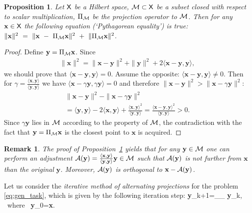 \documentclass[sii]{ipart}
\newtheorem{proposition}{Proposition}
\newtheorem{remark}{Remark}
\newcommand{\bfx}{\textbf{x}}
\newcommand{\bfy}{\textbf{y}}
\begin{document}
\begin{proposition} \label{prop:pythaprop}
	Let $\mathsf{X}$ be a Hilbert space, $\mathcal{M} \subset \mathsf{X}$ be a subset closed with respect to scalar multiplication, $\Pi_{\mathcal{M}}$ be the projection operator to $\mathcal{M}$. Then for any $\bfx \in \sfX$ the following equation (`Pythagorean equality') is true: $\|\bfx\|^2~=~\|\bfx~-~\Pi_\calM \bfx\|^2~+~\|\Pi_\calM \bfx\|^2$.
\end{proposition}

\begin{proof}
	Define $\bfy = \Pi_\calM \bfx$. Since
	\begin{gather*}
	\|\bfx\|^2 = \|\bfx - \bfy \|^2 + \|\bfy \|^2 + 2 \langle \bfx - \bfy, \bfy \rangle,
	\end{gather*}
    we should prove that $\langle \bfx - \bfy, \bfy \rangle = 0$.
	Assume the opposite: $\langle \bfx - \bfy, \bfy \rangle \ne 0$. Then for
    $\gamma = \frac{\langle \bfx, \bfy \rangle}{\langle \bfy, \bfy \rangle}$ we have
    $\langle \bfx - \gamma \bfy, \gamma \bfy \rangle = 0$
    and  therefore $\|\bfx - \bfy\|^2 > \|\bfx - \gamma \bfy\|^2$:
	\begin{gather*}
	\|\bfx - \bfy\|^2 - \|\bfx - \gamma \bfy\|^2 \\ =\langle \bfy, \bfy \rangle - 2 \langle \bfx, \bfy \rangle + \frac{\langle \bfx, \bfy \rangle ^ 2}{\langle \bfy, \bfy \rangle} =
    \frac{\langle \bfx - \bfy, \bfy \rangle^2}{\langle \bfy, \bfy \rangle} > 0.
	\end{gather*}
	Since 	$\gamma \bfy$ lies in $\mathcal{M}$ according to the property of $\mathcal{M}$,
    the contradiction with the fact that $\bfy = \Pi_\calM \bfx$ is the closest point to $\bfx$ is acquired.
\end{proof}

\begin{remark}
\label{rem:adj}
The proof of Proposition~\ref{prop:pythaprop} yields that for any $\bfy\in \calM$ one can perform an adjustment $\calA(\bfy)=\frac{\langle \bfx, \bfy \rangle}{\langle \bfy, \bfy \rangle} \bfy \in \calM$ such that $\calA(\bfy)$
is not further from $\bfx$ than the original $\bfy$. Moreover, $\calA(\bfy)$ is
orthogonal to $\bfx - \calA(\bfy)$.
\end{remark}

Let us consider the \emph{iterative method of alternating projections} for the problem \eqref{eq:gen_task},
which is given by the following iteration step:
\be
\label{eq:iter}
\bfy_{k+1}=\Pi_\calH \Pi_{\calM} \bfy_{k}, \mbox{\ where\ } \bfy_{0}=\bfx.
\ee
\end{document}
